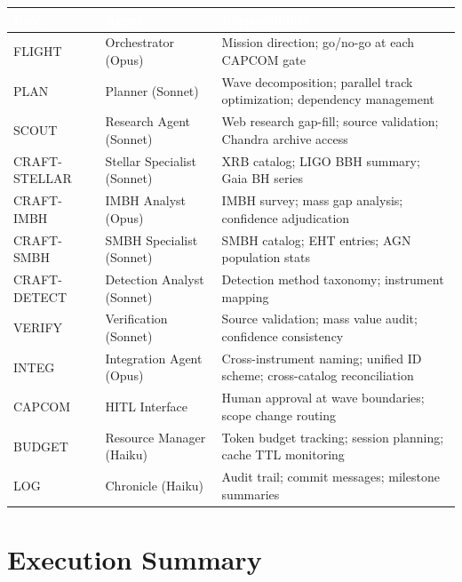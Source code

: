 \documentclass[11pt,letterpaper]{article}
\newcommand{\tableheader}[1]{\textbf{\sffamily\textcolor{white}{#1}}}
\begin{document}
\begin{center}
\begin{tabularx}{\textwidth}{L{2cm}L{3cm}X}
\toprule
{}
\tableheader{Role} & \tableheader{Agent} & \tableheader{Responsibility} \\
\midrule
FLIGHT & Orchestrator (Opus) & Mission direction; go/no-go at each CAPCOM gate \\
PLAN & Planner (Sonnet) & Wave decomposition; parallel track optimization; dependency management \\
SCOUT & Research Agent (Sonnet) & Web research gap-fill; source validation; Chandra archive access \\
CRAFT-STELLAR & Stellar Specialist (Sonnet) & XRB catalog; LIGO BBH summary; Gaia BH series \\
CRAFT-IMBH & IMBH Analyst (Opus) & IMBH survey; mass gap analysis; confidence adjudication \\
CRAFT-SMBH & SMBH Specialist (Sonnet) & SMBH catalog; EHT entries; AGN population stats \\
CRAFT-DETECT & Detection Analyst (Sonnet) & Detection method taxonomy; instrument mapping \\
VERIFY & Verification (Sonnet) & Source validation; mass value audit; confidence consistency \\
INTEG & Integration Agent (Opus) & Cross-instrument naming; unified ID scheme; cross-catalog reconciliation \\
CAPCOM & HITL Interface & Human approval at wave boundaries; scope change routing \\
BUDGET & Resource Manager (Haiku) & Token budget tracking; session planning; cache TTL monitoring \\
LOG & Chronicle (Haiku) & Audit trail; commit messages; milestone summaries \\
\bottomrule
\end{tabularx}
\end{center}

\section{Execution Summary}
\end{document}
